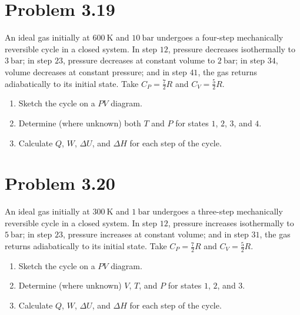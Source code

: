 \documentclass{article}
\begin{document}
\section*{Problem 3.19}
An ideal gas initially at $\SI{600}{\kelvin}$ and $\SI{10}{\bar}$
undergoes a four-step mechanically reversible cycle in a closed
system. In step $12$, pressure decreases isothermally to
$\SI{3}{\bar}$; in step $23$, pressure decreases at constant volume
to $\SI{2}{\bar}$; in step $34$, volume decreases at constant
pressure; and in step $41$, the gas returns adiabatically to its
initial state. Take $C_P = \frac{7}{2}R$ and $C_V = \frac{5}{2}R$.
\begin{enumerate}[label=(\alph*)]
  \item Sketch the cycle on a $PV$ diagram.
  \item Determine (where unknown) both $T$ and $P$ for states $1$, $2$,
    $3$, and $4$.
  \item Calculate $Q$, $W$, $\Delta U$, and $\Delta H$ for each step
    of the cycle.
\end{enumerate}

\section*{Problem 3.20}
An ideal gas initially at $\SI{300}{\kelvin}$ and $\SI{1}{\bar}$
undergoes a three-step mechanically reversible cycle in a closed
system. In step $12$, pressure increases isothermally to
$\SI{5}{\bar}$; in step $23$, pressure increases at constant volume;
and in step $31$, the gas returns adiabatically to its initial state.
Take $C_P = \frac{7}{2}R$ and $C_V = \frac{5}{2}R$.
\begin{enumerate}[label=(\alph*)]
  \item Sketch the cycle on a $PV$ diagram.
  \item Determine (where unknown) $V$, $T$, and $P$ for states $1$,
    $2$, and $3$.
  \item Calculate $Q$, $W$, $\Delta U$, and $\Delta H$ for each step
    of the cycle.
\end{enumerate}
\end{document}

